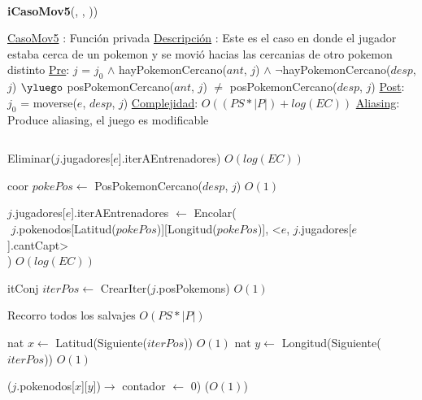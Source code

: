 \begin{Algoritmos}
$ $\newline
$ $\newline


{\textbf{iCasoMov5}(,  , ))}
\begin{algorithmic}[1]

\Statex \underline{CasoMov5} : Funci\'on privada 
\Statex \underline{Descripci\'on} : Este es el caso en donde el jugador estaba cerca de un pokemon y se movi\'o hacias las cercanias de otro pokemon distinto
\Statex \underline{Pre}: $j$ = $j_0$ $\land$ hayPokemonCercano($ant$, $j$) $\land$ $\neg$hayPokemonCercano($desp$, $j$) $\yluego$ posPokemonCercano($ant$, $j$) $\neq$ posPokemonCercano($desp$, $j$)
\Statex \underline{Post}: $j_0$ = moverse($e$, $desp$, $j$) 
\Statex \underline{Complejidad}:  $O((PS *|P|) + log(EC))$ 
\Statex \underline{Aliasing}: Produce aliasing, el juego es modificable

$ $\newline

\State Eliminar($j$.jugadores[$e$].iterAEntrenadores) \Comment $O(log(EC))$

\State coor $pokePos \gets$ PosPokemonCercano($desp$, $j$) \Comment $O(1)$

\State $j$.jugadores[$e$].iterAEntrenadores $\gets$ Encolar(\\
$   $\hspace*{2cm}  $j$.pokenodos[Latitud($pokePos$)][Longitud($pokePos$)], <$e$, $j$.jugadores[$e$].cantCapt>\\
$   $\hspace*{1cm}) \Comment $O(log(EC))$


\State itConj $iterPos \gets$ CrearIter($j$.posPokemons) \Comment $O(1)$ 

 Recorro todos los salvajes \Comment $O(PS * |P|)$

  \State nat $x \gets$ Latitud(Siguiente($iterPos$)) \Comment $O(1)$
  \State nat $y \gets$ Longitud(Siguiente($iterPos$)) \Comment $O(1)$   

    \State ($j$.pokenodos[$x$][$y$])$\rightarrow$ contador $\gets$ 0) \Comment($O(1)$)
  \EndIf


\end{algorithmic}
\end{Algoritmos}
